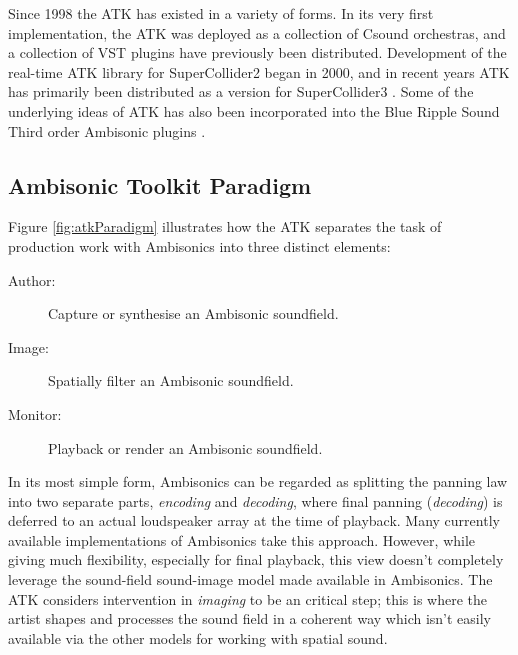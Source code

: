 \documentclass{article}
\begin{document}
Since 1998 the ATK has existed in a variety of forms.
In its very first implementation, the ATK was deployed as a collection of Csound orchestras, and a collection of VST plugins have previously been distributed.
Development of the real-time ATK library for SuperCollider2 began in 2000, and in recent years ATK has primarily been distributed as a version for SuperCollider3 \cite{Anderson:2009introducingATK}.
Some of the underlying ideas of ATK has also been incorporated into the Blue Ripple Sound Third order Ambisonic plugins \cite{blueripple:2014TOA}.

\subsection{Ambisonic Toolkit Paradigm}\label{sec:atk-model}



Figure \ref{fig:atkParadigm} illustrates how the ATK separates the task of production work with Ambisonics into three distinct elements:

\begin{description}
  \item[Author:] Capture or synthesise an Ambisonic soundfield.
  \item[Image:] Spatially filter an Ambisonic soundfield.
  \item[Monitor:] Playback or render an Ambisonic soundfield.
\end{description}

In its most simple form, Ambisonics can be regarded as splitting the panning law into two separate parts, {\em encoding} and {\em decoding}, where final panning ({\em decoding}) is deferred to an actual loudspeaker array at the time of playback. Many currently available implementations of Ambisonics take this approach. However, while giving much flexibility, especially for final playback, this view doesn't completely leverage the sound-field sound-image model made available in Ambisonics. The ATK considers intervention in {\em imaging} to be an critical step; this is where the artist shapes and processes the sound field in a coherent way which isn't easily available via the other models for working with spatial sound.
\end{document}
